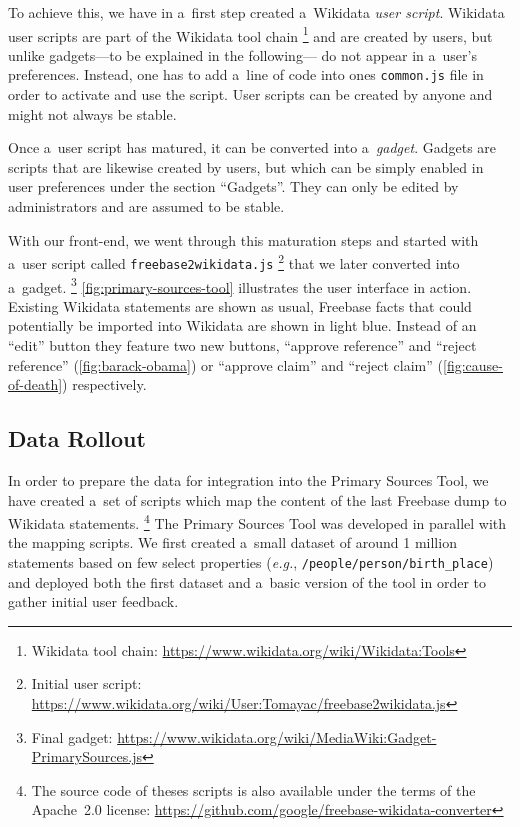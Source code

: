 \documentclass{acm_proc_article-sp}
\begin{document}
To achieve this, we have in a~first step created a~Wikidata \emph{user script}.
Wikidata user scripts are part of the Wikidata tool chain%
\footnote{Wikidata tool chain:
\url{https://www.wikidata.org/wiki/Wikidata:Tools}}
and are created by users, but unlike gadgets---to be explained in the following---%
do not appear in a~user's preferences.
Instead, one has to add a~line of code into ones \texttt{common.js} file
in order to activate and use the script.
User scripts can be created by anyone and might not always be stable.

Once a~user script has matured, it can be converted into a~\emph{gadget}.
Gadgets are scripts that are likewise created by users,
but which can be simply enabled in user preferences under the section ``Gadgets''.
They can only be edited by administrators and are assumed to be stable.

With our front-end, we went through this maturation steps
and started with a~user script called \texttt{freebase2wikidata.js}%
\footnote{Initial user script:
\url{https://www.wikidata.org/wiki/User:Tomayac/freebase2wikidata.js}}
that we later converted into a~gadget.%
\footnote{Final gadget: \url{https://www.wikidata.org/wiki/MediaWiki:Gadget-PrimarySources.js}}
\autoref{fig:primary-sources-tool} illustrates the user interface in action.
Existing Wikidata statements are shown as usual,
Freebase facts that could potentially be imported into Wikidata are shown in light blue.
Instead of an ``edit'' button they feature two new buttons,
``approve reference'' and ``reject reference''
(\autoref{fig:barack-obama}) or ``approve claim'' and ``reject claim''
(\autoref{fig:cause-of-death}) respectively.

\subsection{Data Rollout}

In order to prepare the data for integration into the Primary Sources Tool,
we have created a~set of scripts which map the content
of the last Freebase dump to Wikidata statements.%
\footnote{The source code of theses scripts is also available under the terms of the Apache~2.0 license:
\url{https://github.com/google/freebase-wikidata-converter}}
The Primary Sources Tool was developed in parallel with the mapping scripts.
We first created a~small dataset of around 1 million statements
based on few select properties (\emph{e.g.}, \texttt{/people/person/birth\_place})
and deployed both the first dataset and a~basic version of the tool
in order to gather initial user feedback.
\end{document}
